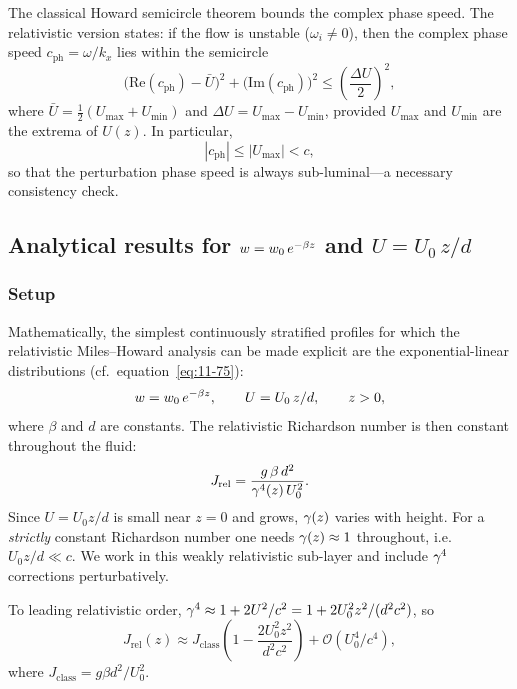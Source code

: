 The classical Howard semicircle theorem bounds the complex phase speed.
The relativistic version states: if the flow is unstable ($\omega_{i}\neq 0$), then the complex phase speed $c_{\mathrm{ph}}=\omega/k_{x}$ lies within the semicircle
\begin{equation}
\label{eq:rel-11-28}
\bigl(\mathrm{Re}(c_{\mathrm{ph}})-\bar{U}\bigr)^{2}
+ \bigl(\mathrm{Im}(c_{\mathrm{ph}})\bigr)^{2}
\leqslant \left(\frac{\Delta U}{2}\right)^{2},
\end{equation}
where $\bar{U}=\frac{1}{2}(U_{\max}+U_{\min})$ and $\Delta U=
U_{\max}-U_{\min}$, provided $U_{\max}$ and $U_{\min}$ are the
extrema of $U(z)$.  In particular,
\begin{equation}
\label{eq:rel-11-29}
\boxed{
|c_{\mathrm{ph}}| \leqslant |U_{\max}| < c,
}
\end{equation}
so that the perturbation phase speed is always sub-luminal---a
necessary consistency check.

\subsection{Analytical results for $w = w_{0}\,
e^{-\beta z}$ and $U = U_{0}\,z/d$}
\label{sec:rel-103-analytic}

\subsubsection{Setup}
Mathematically, the simplest continuously stratified profiles for which
the relativistic Miles--Howard analysis can be made explicit are the
exponential-linear distributions (cf.\ equation~\eqref{eq:11-75}):
\begin{equation}
\label{eq:rel-11-30}
w = w_{0}\,e^{-\beta z},\qquad
U = U_{0}\,z/d,\qquad z > 0,
\end{equation}
where $\beta$ and $d$ are constants.  The relativistic Richardson
number is then constant throughout the fluid:
\begin{equation}
\label{eq:rel-11-31}
J_{\mathrm{rel}} = \frac{g\,\beta\,d^{2}}{\gamma^{4}(z)\,U_{0}^{2}}.
\end{equation}
Since $U=U_{0}z/d$ is small near $z=0$ and grows, $\gamma(z)$ varies
with height.  For a \emph{strictly} constant Richardson number one
needs $\gamma(z)\approx 1$ throughout, i.e.\ $U_{0}z/d\ll c$.  We work
in this weakly relativistic sub-layer and include $\gamma^{4}$ corrections
perturbatively.

To leading relativistic order, $\gamma^{4}\approx 1+2U^{2}/c^{2}=
1+2U_{0}^{2}z^{2}/(d^{2}c^{2})$, so
\begin{equation}
\label{eq:rel-11-32}
J_{\mathrm{rel}}(z)
\approx J_{\mathrm{class}}
\left(1 - \frac{2U_{0}^{2}z^{2}}{d^{2}c^{2}}\right)
+ \mathcal{O}(U_{0}^{4}/c^{4}),
\end{equation}
where $J_{\mathrm{class}}=g\beta d^{2}/U_{0}^{2}$.

